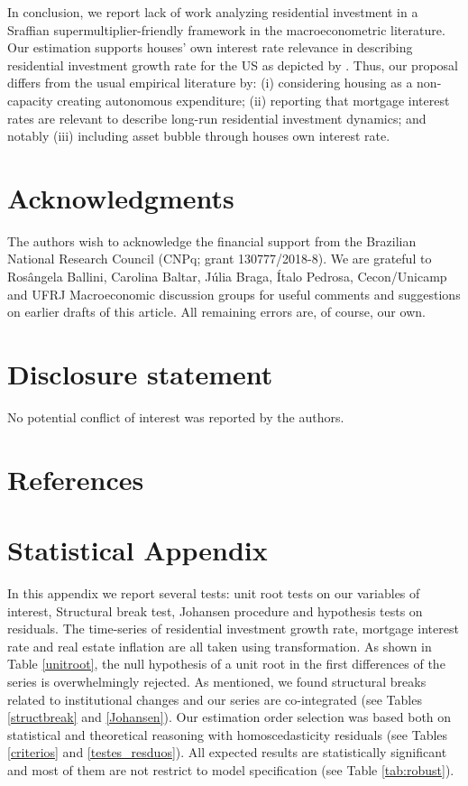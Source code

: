 \documentclass[11pt]{article}
\begin{document}
In conclusion,  we report lack of work analyzing residential investment in a Sraffian supermultiplier-friendly framework in the macroeconometric literature.
Our estimation supports houses' own interest rate relevance in describing residential investment growth rate for the US as depicted by \textcite{teixeira_crescimento_2015}.
Thus, our  proposal differs from the usual empirical literature by:
	(i) considering housing as a non-capacity creating autonomous expenditure;
	(ii) reporting that mortgage interest rates are relevant to describe long-run residential investment dynamics; and notably 
	(iii) including asset bubble through houses own interest rate.


\section*{Acknowledgments}
\label{sec:orgb78ea41}
\noindent The authors wish to acknowledge the financial support from the Brazilian National Research Council (CNPq; grant 130777/2018-8). We are grateful to Rosângela Ballini, Carolina Baltar, Júlia Braga, Ítalo Pedrosa, Cecon/Unicamp and UFRJ Macroeconomic discussion groups for useful comments and suggestions on earlier drafts of this article. All remaining errors are, of course, our own.


\section*{Disclosure statement}
\label{sec:org59c165d}
No potential conflict of interest was reported by the authors.

\section*{References}
\label{sec:org2463921}
\printbibliography[heading=none]


\appendix
\section{Statistical Appendix}
\label{sec:org070462c}
\label{appen:A}

In this appendix we report several tests: unit root tests on our variables of interest, Structural break test, Johansen procedure and hypothesis tests on residuals. 
The time-series of residential investment growth rate, mortgage interest rate and real estate inflation are all taken using \textcite{yeo_new_2000} transformation.  
As shown in Table \ref{unitroot}, the null hypothesis of a unit root in the first differences of the series is overwhelmingly rejected.
As mentioned, we found structural breaks related to institutional changes and our series are co-integrated (see Tables \ref{structbreak} and \ref{Johansen}).
Our estimation order selection was based both on statistical and theoretical reasoning with homoscedasticity residuals (see Tables \ref{criterios} and \ref{testes_resduos}).
All expected results are statistically significant and most of them are not restrict to model specification (see Table \ref{tab:robust}).







\end{document}
